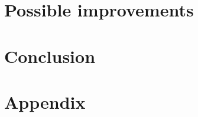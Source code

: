 \documentclass[11pt,a4paper]{book}
\begin{document}
\chapter{Possible improvements}
\label{c:improvements}


\chapter{Conclusion}
\label{c:conclusion}

\appendix
\chapter{Appendix}
\label{c:appendix}





\end{document}
